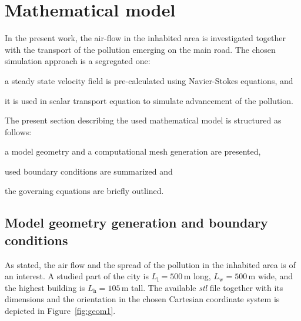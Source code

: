 \cleardoublepage
\section{Mathematical model}
\label{sec:mathMod}
In the present work, the air-flow in the inhabited area is investigated together with the transport of the pollution emerging on the main road. The chosen simulation approach is a segregated one: 
\begin{inparaenum}[(i)]
    \item a steady state velocity field is pre-calculated using Navier-Stokes equations, and
    \item it is used in scalar transport equation to simulate advancement of the pollution. 
\end{inparaenum}

The present section describing the used mathematical model is structured as follows: 
\begin{inparaenum}[(i)]
    \item a model geometry and a computational mesh generation are presented,
    \item used boundary conditions are summarized and
    \item the governing equations are briefly outlined.
\end{inparaenum}

\subsection{Model geometry generation and boundary conditions}
\label{subsec:geomGen}
As stated, the air flow and the spread of the pollution in the inhabited area is of an interest. A studied part of the city is $L_{\mathrm{l}} = 500$\,m long, $L_{\mathrm{w}} = 500$\,m wide, and the highest building is $L_{\mathrm{h}} = 105$\,m tall. The available \textit{stl} file together with its dimensions and the orientation in the chosen Cartesian coordinate system is depicted in Figure~\ref{fig:geom1}.

